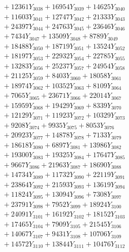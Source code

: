 \documentclass[a4paper,10pt]{article}
\begin{document}
{\begin{align}
&\;  + 12361 Y_{3038} + 16954 Y_{3039} + 14625 Y_{3040} \\[0.3ex]
&\;  + 11603 Y_{3041} + 12747 Y_{3042} + 21333 Y_{3043} \\[0.3ex]
&\;  + 24397 Y_{3044} + 24763 Y_{3045} + 23646 Y_{3046} \\[0.3ex]
&\;  + 7434 Y_{3047} + 13509 Y_{3048} + 8789 Y_{3049} \\[0.3ex]
&\;  + 18488 Y_{3050} + 18719 Y_{3051} + 13524 Y_{3052} \\[0.3ex]
&\;  + 18197 Y_{3053} + 22932 Y_{3054} + 22785 Y_{3055} \\[0.3ex]
&\;  + 13283 Y_{3056} + 25237 Y_{3057} + 24954 Y_{3058} \\[0.5ex]\allowbreak
&\;  + 21125 Y_{3059} + 8403 Y_{3060} + 18058 Y_{3061} \\[0.3ex]
&\;  + 18974 Y_{3062} + 10352 Y_{3063} + 8109 Y_{3064} \\[0.3ex]
&\;  + 7065 Y_{3065} + 23671 Y_{3066} + 22014 Y_{3067} \\[0.3ex]
&\;  + 15959 Y_{3068} + 19429 Y_{3069} + 8339 Y_{3070} \\[0.3ex]
&\;  + 12129 Y_{3071} + 11923 Y_{3072} + 10329 Y_{3073} \\[0.3ex]
&\;  + 9208 Y_{3074} + 9935 Y_{3075} + 8053 Y_{3076} \\[0.3ex]
&\;  + 20923 Y_{3077} + 14878 Y_{3078} + 7133 Y_{3079} \\[0.3ex]
&\;  + 18618 Y_{3080} + 6897 Y_{3081} + 13986 Y_{3082} \\[0.3ex]
&\;  + 19300 Y_{3083} + 19325 Y_{3084} + 17647 Y_{3085} \\[0.3ex]
&\;  + 9667 Y_{3086} + 21963 Y_{3087} + 18690 Y_{3088} \\[0.5ex]\allowbreak
&\;  + 14734 Y_{3089} + 11732 Y_{3090} + 22119 Y_{3091} \\[0.3ex]
&\;  + 23864 Y_{3092} + 21593 Y_{3093} + 13619 Y_{3094} \\[0.3ex]
&\;  + 11824 Y_{3095} + 13094 Y_{3096} + 7308 Y_{3097} \\[0.3ex]
&\;  + 23791 Y_{3098} + 7952 Y_{3099} + 18924 Y_{3100} \\[0.3ex]
&\;  + 24091 Y_{3101} + 16192 Y_{3102} + 18152 Y_{3103} \\[0.3ex]
&\;  + 17465 Y_{3104} + 7909 Y_{3105} + 21545 Y_{3106} \\[0.3ex]
&\;  + 14067 Y_{3107} + 9431 Y_{3108} + 10706 Y_{3109} \\[0.3ex]
&\;  + 14572 Y_{3110} + 13844 Y_{3111} + 10476 Y_{3112} \\[0.3ex]

\end{align}}
\end{document}
